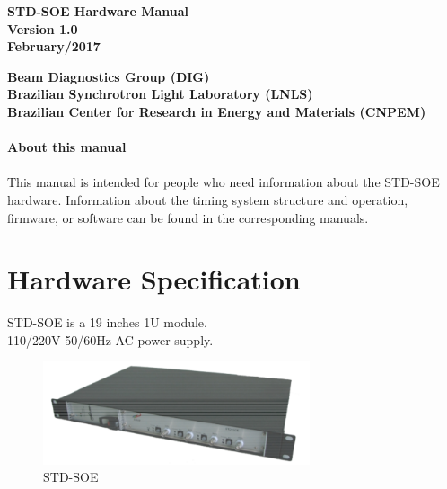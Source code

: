 \documentclass[openany]{article}
\begin{document}
\begin{titlepage}

\thispagestyle{fancy}

\begin{center}

\vspace*{\fill}
\textbf{\Huge STD-SOE Hardware Manual}\\[20pt]
\textbf{\Huge Version 1.0}\\[20pt]
\textbf{\Huge February/2017}
\vspace*{\fill}

\vfill
\textbf{Beam Diagnostics Group (DIG)}\\[5pt]
\textbf{Brazilian Synchrotron Light Laboratory (LNLS)}\\[5pt]
\textbf{Brazilian Center for Research in Energy and Materials (CNPEM)}
\end{center}

\end{titlepage}

\newpage
\pagestyle{plain}

\paragraph{}{\Large\bfseries About this manual}

\paragraph{} This manual is intended for people who need information about the STD-SOE hardware. Information about the timing system structure and operation, firmware, or software can be found in the corresponding manuals.

\tableofcontents

\newpage
\section{Hardware Specification}

\par STD-SOE is a 19 inches 1U module. \\ 110/220V 50/60Hz AC power supply.

\begin{figure}[!h]
\caption{STD-SOE}
\label{fig:std-soe}
\centering
\includegraphics[width=0.7\textwidth]{std-soe-image}
\end{figure}
\end{document}
